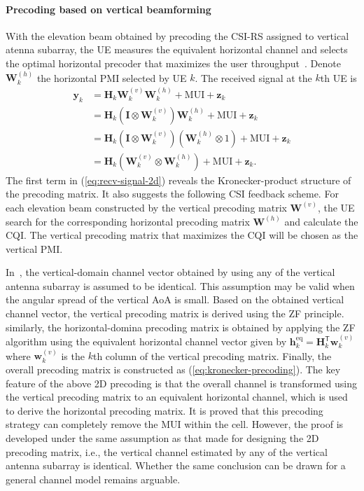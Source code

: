 \documentclass[a4paper,12pt]{article}%
\begin{document}
\paragraph{Precoding based on vertical beamforming}

With the elevation beam obtained by precoding the CSI-RS assigned to vertical atenna subarray, the UE measures the equivalent horizontal channel and selects the optimal horizontal precoder that maximizes the user throughput~\cite{Song2014}. Denote $\mathbf{W}^{(h)}_k$ the horizontal PMI selected by UE $k$. The received signal at the $k$th UE is
\begin{align}\label{eq:recv-signal-2d}
\mathbf{y}_k &= \mathbf{H}_k \mathbf{W}^{(v)}_k \mathbf{W}^{(h)}_k + \text{MUI} + \mathbf{z}_k \nonumber \\
&= \mathbf{H}_k(\mathbf{I} \otimes \mathbf{W}^{(v)}_k )\mathbf{W}_k^{(h)}+\text{MUI} + \mathbf{z}_k \nonumber \\
&= \mathbf{H}_k(\mathbf{I} \otimes \mathbf{W}^{(v)}_k )(\mathbf{W}_k^{(h)} \otimes 1)+\text{MUI} + \mathbf{z}_k \nonumber \\
&= \mathbf{H}_k(\mathbf{W}^{(v)}_k \otimes \mathbf{W}_k^{(h)})+\text{MUI} + \mathbf{z}_k.
\end{align}
The first term in (\ref{eq:recv-signal-2d}) reveals the Kronecker-product structure of the precoding matrix. It also suggests the following CSI feedback scheme. For each elevation beam constructed by the vertical precoding matrix $\mathbf{W}^{(v)}$, the UE search for the corresponding horizontal precoding matrix $\mathbf{W}^{(h)}$ and calculate the CQI. The vertical precoding matrix that maximizes the CQI will be chosen as the vertical PMI.

In~\cite{Wang2007}, the vertical-domain channel vector obtained by using any of the vertical antenna subarray is assumed to be identical. This assumption may be valid when the angular spread of the vertical AoA is small. Based on the obtained vertical channel vector, the vertical precoding matrix is derived using the ZF principle. similarly, the horizontal-domina precoding matrix is obtained by applying the ZF algorithm using the equivalent horizontal channel vector given by $\mathbf{h}_k^{\text{eq}}=\mathbf{H}_k^\mathsf{T} \mathbf{w}_k^{(v)}$ where $\mathbf{w}_k^{(v)}$ is the $k$th column of the vertical precoding matrix. Finally, the overall precoding matrix is constructed as (\ref{eq:kronecker-precoding}). The key feature of the above 2D precoding is that the overall channel is transformed using the vertical precoding matrix to an equivalent horizontal channel, which is   used to derive the horizontal precoding matrix. It is proved that this precoding strategy can completely remove the MUI within the cell. However, the proof is developed under the same assumption as that made for designing the 2D precoding matrix, i.e., the vertical channel estimated by any of the vertical antenna subarray is identical. Whether the same conclusion can be drawn for a general channel model remains arguable.
\end{document}

